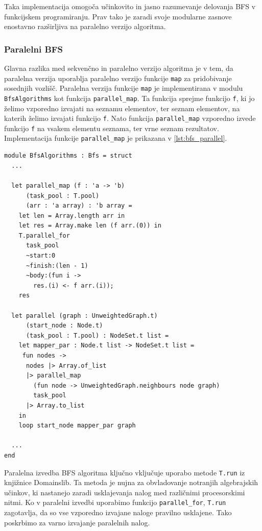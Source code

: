 \documentclass[fin1, tisk]{fmfdelo}
\begin{document}
Taka implementacija omogoča učinkovito in jasno razumevanje delovanja BFS v funkcijskem programiranju. Prav tako je zaradi
svoje modularne zasnove enostavno razširljiva na paralelno verzijo algoritma.

\subsubsection{Paralelni BFS}

Glavna razlika med sekvenčno in paralelno verzijo algoritma je v tem, da paralelna verzija uporablja paralelno verzijo
funkcije \texttt{map} za pridobivanje sosednjih vozlišč. Paralelna verzija funkcije \texttt{map} je implementirana
v modulu \texttt{BfsAlgorithms} kot funkcija \texttt{parallel\_map}. Ta funkcija sprejme funkcijo \texttt{f}, ki jo
želimo vzporedno izvajati na seznamu elementov, ter seznam elementov, na katerih želimo izvajati funkcijo \texttt{f}.
Nato funkcija \texttt{parallel\_map} vzporedno izvede funkcijo \texttt{f} na vsakem elementu seznama, ter vrne seznam
rezultatov. Implementacija funkcije \texttt{parallel\_map} je prikazana v \ref{lst:bfs_parallel}.

\begin{lstlisting}[label=lst:bfs_parallel]
module BfsAlgorithms : Bfs = struct
  ...

  let parallel_map (f : 'a -> 'b)
      (task_pool : T.pool)
      (arr : 'a array) : 'b array =
    let len = Array.length arr in
    let res = Array.make len (f arr.(0)) in
    T.parallel_for 
      task_pool 
      ~start:0 
      ~finish:(len - 1) 
      ~body:(fun i ->
        res.(i) <- f arr.(i));
    res

  let parallel (graph : UnweightedGraph.t)
      (start_node : Node.t)
      (task_pool : T.pool) : NodeSet.t list =
    let mapper_par : Node.t list -> NodeSet.t list =
     fun nodes ->
      nodes |> Array.of_list
      |> parallel_map
        (fun node -> UnweightedGraph.neighbours node graph)
        task_pool
      |> Array.to_list
    in
    loop start_node mapper_par graph

  ...
end

\end{lstlisting}

Paralelna izvedba BFS algoritma ključno vključuje uporabo metode \texttt{T.run} iz knjižnice Domainslib. Ta metoda je
nujna za obvladovanje notranjih algebrajskih učinkov, ki nastanejo zaradi usklajevanja nalog med različnimi procesorskimi nitmi.
Ko v paralelni izvedbi uporabimo funkcijo \texttt{parallel\_for}, \texttt{T.run} zagotavlja, da so vse vzporedno
izvajane naloge pravilno usklajene. Tako poskrbimo za varno izvajanje paralelnih nalog.
\end{document}
